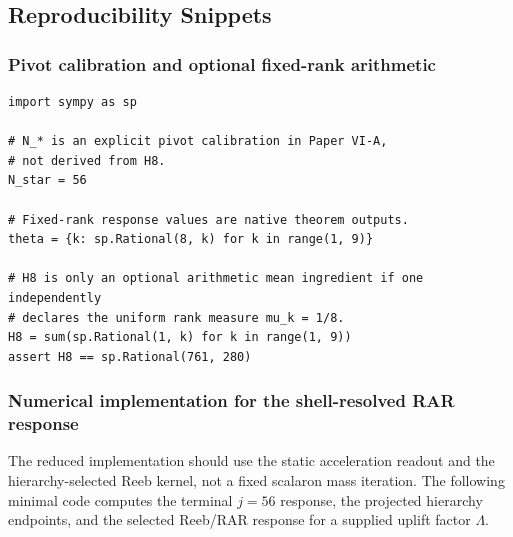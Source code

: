 \documentclass[12pt,a4paper]{article}
\begin{document}
\subsection{Reproducibility Snippets}
\subsubsection{Pivot calibration and optional fixed-rank arithmetic}
\begin{verbatim}
import sympy as sp

# N_* is an explicit pivot calibration in Paper VI-A,
# not derived from H8.
N_star = 56

# Fixed-rank response values are native theorem outputs.
theta = {k: sp.Rational(8, k) for k in range(1, 9)}

# H8 is only an optional arithmetic mean ingredient if one independently
# declares the uniform rank measure mu_k = 1/8.
H8 = sum(sp.Rational(1, k) for k in range(1, 9))
assert H8 == sp.Rational(761, 280)
\end{verbatim}

\subsubsection{Numerical implementation for the shell-resolved RAR response}
\label{p8:app:darkmatter}

The reduced implementation should use the static acceleration readout and the hierarchy-selected Reeb kernel, not a fixed scalaron mass iteration.  The following minimal code computes the terminal \(j=56\) response, the projected hierarchy endpoints, and the selected Reeb/RAR response for a supplied uplift factor \(\Lambda\).
\end{document}
